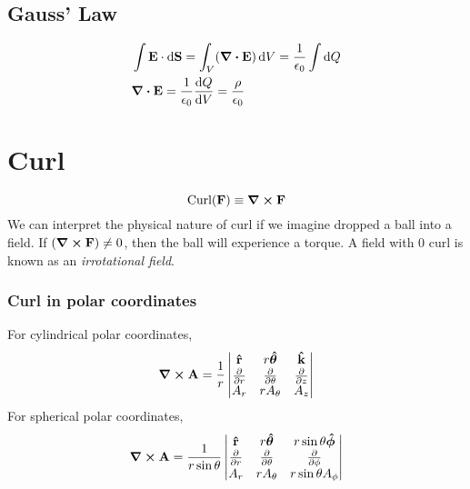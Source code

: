 \documentclass{book}
\begin{document}
\subsection{Gauss' Law}
\begin{equation}
\begin{split}
    &\int\vb{E}\cdot\dd{\vb{S}} = \int_V(\div{\vb{E}})\dd{V} = \frac{1}{\epsilon_0}\int\dd{Q} \\
    &\div{\vb{E}} = \frac{1}{\epsilon_0}\dv{Q}{V} = \frac{\rho}{\epsilon_0}\\
\end{split}
\end{equation}
\section{Curl}
\begin{equation}
    \text{Curl}(\vb{F}) \equiv \curl{\vb{F}}
\end{equation}
We can interpret the physical nature of curl if we imagine dropped a ball into a field. If $(\curl{\vb{F}}) \neq 0$, then the ball will experience a torque. A field with 0 curl is known as an \textit{irrotational field}.
\subsubsection{Curl in polar coordinates}
For cylindrical polar coordinates,
\begin{equation}
    \curl{\vb{A}} = \frac{1}{r}\begin{vmatrix}
        \vu{r} & r\vu*{\theta} & \vu{k} \\
        \pdv{}{r} & \pdv{}{\theta} & \pdv{}{z} \\
        A_r & rA_{\theta} & A_z
    \end{vmatrix}
\end{equation}
For spherical polar coordinates,
\begin{equation}
    \curl{\vb{A}} = \frac{1}{r\sin\theta}\begin{vmatrix}
        \vu{r} & r\vu*{\theta} & r\sin\theta\vu*{\phi} \\
        \pdv{}{r} & \pdv{}{\theta} & \pdv{}{\phi} \\
        A_r & rA_{\theta} & r\sin\theta A_{\phi}
    \end{vmatrix}
\end{equation}
\end{document}
